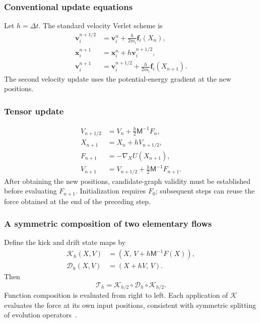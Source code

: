 \documentclass[11pt,a4paper]{article}
\newcommand{\vect}[1]{\bm{#1}}
\newcommand{\mass}{\mathsf M}
\theoremstyle{definition}
\begin{document}
\subsubsection{Conventional update equations}
Let $h=\Delta t$. The standard velocity Verlet scheme is~\cite{tuckerman1992,gromacs-md}
\begin{align}
\vect v_i^{n+1/2}&=\vect v_i^n+\frac{h}{2m_i}\vect f_i(X_n),\\
\vect x_i^{n+1}&=\vect x_i^n+h\vect v_i^{n+1/2},\\
\vect v_i^{n+1}&=\vect v_i^{n+1/2}+\frac{h}{2m_i}\vect f_i(X_{n+1}).
\label{eq:vv-traditional}
\end{align}
The second velocity update uses the potential-energy gradient at the new positions.

\subsubsection{Tensor update}
\begin{equation}
\begin{aligned}
V_{n+1/2}&=V_n+\frac h2\mass^{-1}F_n,\\
X_{n+1}&=X_n+hV_{n+1/2},\\
F_{n+1}&=-\nabla_XU(X_{n+1}),\\
V_{n+1}&=V_{n+1/2}+\frac h2\mass^{-1}F_{n+1}.
\end{aligned}
\label{eq:vv-tensor}
\end{equation}
After obtaining the new positions, candidate-graph validity must be established before
evaluating $F_{n+1}$. Initialization requires $F_0$; subsequent steps can reuse the force
obtained at the end of the preceding step.

\subsubsection{A symmetric composition of two elementary flows}
Define the kick and drift state maps by
\begin{align}
\mathcal K_h(X,V)&=(X,\,V+h\mass^{-1}F(X)),\\
\mathcal D_h(X,V)&=(X+hV,\,V).
\end{align}
Then
\begin{equation}
\mathcal T_h=\mathcal K_{h/2}\circ\mathcal D_h\circ\mathcal K_{h/2}.
\label{eq:vv-composition}
\end{equation}
Function composition is evaluated from right to left. Each application of $\mathcal K$ evaluates
the force at its own input positions, consistent with symmetric splitting of evolution
operators~\cite{tuckerman1992,gromacs-md}.
\end{document}

